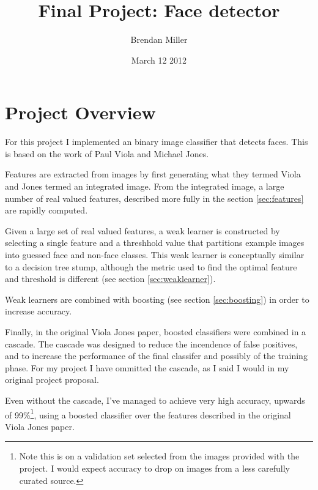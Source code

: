 \documentclass[11pt,twocolumn]{article}
\title{Final Project: Face detector}
\author{Brendan Miller}
\date{March 12 2012}
\begin{document}

\section{Project Overview}

For this project I implemented an binary image classifier that detects
faces. This is based on the work of Paul Viola and Michael
Jones\cite{violajones2001}.

Features are extracted from images by first generating what they
termed Viola and Jones termed an integrated image. From the integrated
image, a large number of real valued features, described more fully in
the section \ref{sec:features} are rapidly computed.

Given a large set of real valued features, a weak learner is
constructed by selecting a single feature and a threshhold value that
partitions example images into guessed face and non-face classes. This
weak learner is conceptually similar to a decision tree stump,
although the metric used to find the optimal feature and threshold
is different (see section \ref{sec:weaklearner}).

Weak learners are combined with boosting (see section
\ref{sec:boosting}) in order to increase accuracy.

Finally, in the original Viola Jones paper, boosted classifiers were
combined in a cascade. The cascade was designed to reduce the
incendence of false positives, and to increase the performance of the
final classifer and possibly of the training phase. For my project I
have ommitted the cascade, as I said I would in my original project
proposal.

Even without the cascade, I've managed to achieve very high accuracy,
upwards of 99\%\footnote{Note this is on a validation set selected
  from the images provided with the project. I would expect accuracy
  to drop on images from a less carefully curated source.}, using a
boosted classifier over the features described in the original Viola
Jones paper.
\end{document}
